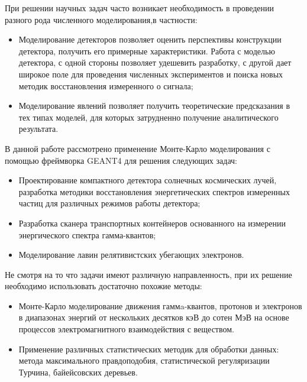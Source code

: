 
При решении научных задач часто возникает необходимость в проведении разного рода численного моделирования,в частности:
\begin{itemize}
    \item Моделирование детекторов позволяет оценить перспективы конструкции детектора, получить его примерные характеристики. Работа с моделью детектора, с одной стороны позволяет удешевить разработку, с другой дает широкое поле для проведения численных экспериментов и поиска новых методик восстановления измеренного о сигнала;
    \item Моделирование явлений позволяет получить теоретические предсказания в тех типах моделей, для которых затрудненно получение аналитического результата.
\end{itemize}

В данной работе рассмотрено применение Монте-Карло моделирования с помощью фреймворка GEANT4 для решения следующих задач:
\begin{itemize}
    \item Проектирование компактного детектора солнечных космических лучей, разработка методики восстановления энергетических спектров измеренных частиц для различных режимов работы детектора;
    \item Разработка сканера транспортных контейнеров основанного на измерении энергического спектра гамма-квантов;
    \item Моделирование лавин релятивистских убегающих электронов.
\end{itemize}

Не смотря на то что задачи имеют различную направленность, при их решение необходимо использовать достаточно похожие методы:
\begin{itemize}
    \item Монте-Карло моделирование движения гаммa-квантов, протонов и электронов в диапазонах энергий от нескольких десятков кэВ до сотен МэВ на основе процессов электромагнитного взаимодействия с веществом.
    \item Применение различных статистических методик для обработки данных: метода максимального правдоподобия, статистической регуляризации Турчина, байейсовских деревьев.
\end{itemize}


